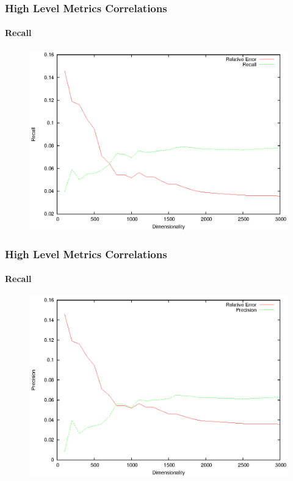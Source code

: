 \documentclass{beamer}
\begin{document}
\begin{frame}
\frametitle{High Level Metrics Correlations}
\framesubtitle{Recall}
 		\begin{figure}
		\includegraphics[scale=0.88]{recall.eps}
	\end{figure}
\end{frame}

\begin{frame}
\frametitle{High Level Metrics Correlations}
\framesubtitle{Recall}
 		\begin{figure}
		\includegraphics[scale=0.88]{precision.eps}
	\end{figure}
\end{frame}
\end{document}
